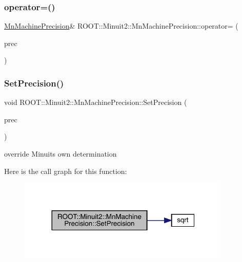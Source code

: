 \subsubsection{\texorpdfstring{operator=()}{operator=()}\hspace{0.1cm}{\footnotesize\ttfamily [2/2]}}
{\footnotesize\ttfamily \mbox{\hyperlink{classROOT_1_1Minuit2_1_1MnMachinePrecision}{Mn\+Machine\+Precision}}\& R\+O\+O\+T\+::\+Minuit2\+::\+Mn\+Machine\+Precision\+::operator= (\begin{DoxyParamCaption}\item[{const \mbox{\hyperlink{classROOT_1_1Minuit2_1_1MnMachinePrecision}{Mn\+Machine\+Precision}} \&}]{prec }\end{DoxyParamCaption})\hspace{0.3cm}{\ttfamily [inline]}}

\mbox{\label{classROOT_1_1Minuit2_1_1MnMachinePrecision_a625938e3c6362a06d09fc76e59f366b6}} 
\subsubsection{\texorpdfstring{SetPrecision()}{SetPrecision()}\hspace{0.1cm}{\footnotesize\ttfamily [1/2]}}
{\footnotesize\ttfamily void R\+O\+O\+T\+::\+Minuit2\+::\+Mn\+Machine\+Precision\+::\+Set\+Precision (\begin{DoxyParamCaption}\item[{double}]{prec }\end{DoxyParamCaption})\hspace{0.3cm}{\ttfamily [inline]}}



override Minuit\textquotesingle{}s own determination 

Here is the call graph for this function\+:
\nopagebreak
\begin{figure}[H]
\begin{center}
\leavevmode
\includegraphics[width=287pt]{d4/d40/classROOT_1_1Minuit2_1_1MnMachinePrecision_a625938e3c6362a06d09fc76e59f366b6_cgraph}
\end{center}
\end{figure}
\mbox{\label{classROOT_1_1Minuit2_1_1MnMachinePrecision_a625938e3c6362a06d09fc76e59f366b6}} 
